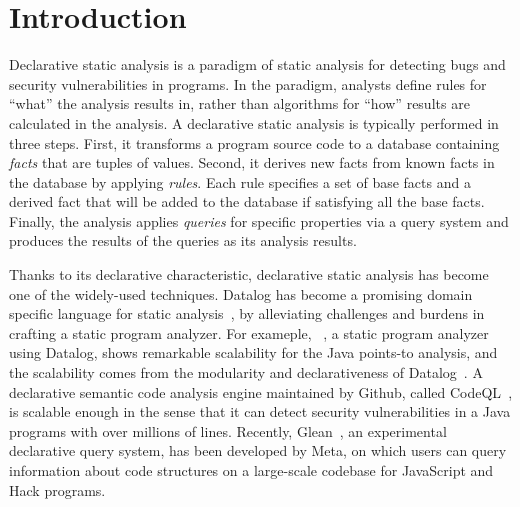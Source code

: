 \section{Introduction}

Declarative static analysis is a paradigm of static analysis for detecting bugs
and security vulnerabilities in programs.
In the paradigm, analysts define rules for ``what'' the analysis results in,
rather than algorithms for ``how'' results are calculated in the analysis.
A declarative static analysis is typically performed in three steps.
First, it transforms a program source code to a database containing
\textit{facts} that are tuples of values. 
Second, it derives new facts from known facts in the database by applying {\it
rules}. 
Each rule specifies a set of base facts and a derived fact that will be added
to the database if satisfying all the base facts.
Finally, the analysis applies {\it queries} for specific properties via a query
system and produces the results of the queries as its analysis results.

Thanks to its declarative characteristic, declarative static analysis has
become one of the widely-used techniques.
Datalog has become a promising domain specific language for static
analysis~\cite{doop, allen2015D, allen2015stagedD, alpuente2010D, dawson1996D,
naik2006D, reps1994D, smaragdakis2014D, whaley2005D, scholz2016}, by
alleviating challenges and burdens in crafting a static program analyzer.
For exameple, \doop~\cite{doop}, a static program analyzer using Datalog, shows
remarkable scalability for the Java points-to analysis, and the scalability
comes from the modularity and declarativeness of Datalog~\cite{doopWorkshop}.
A declarative semantic code analysis engine maintained by Github, called
CodeQL~\cite{codeql}, is scalable enough in the sense that it can detect
security vulnerabilities in a Java programs with over millions of lines.
Recently, Glean~\cite{glean}, an experimental declarative query system, has
been developed by Meta, on which users can query information about code
structures on a large-scale codebase for JavaScript and Hack programs.

